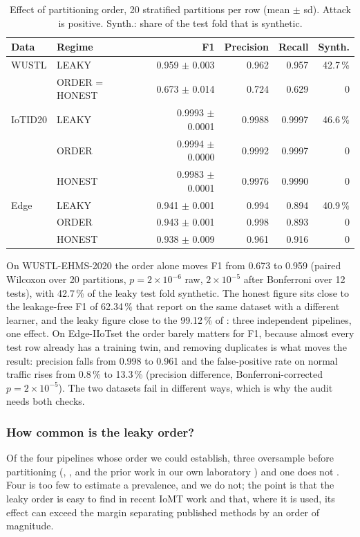 \begin{table}[t]
\caption{Effect of partitioning order, 20 stratified partitions per row (mean $\pm$ sd). Attack is positive. Synth.: share of the test fold that is synthetic.}
\label{tab:order}
\centering\footnotesize
\begin{tabular}{@{}llrrrr@{}}
\toprule
\textbf{Data} & \textbf{Regime} & \textbf{F1} & \textbf{Precision} & \textbf{Recall} & \textbf{Synth.} \\
\midrule
WUSTL & LEAKY & 0.959 $\pm$ 0.003 & 0.962 & 0.957 & 42.7\,\% \\
& ORDER = HONEST & 0.673 $\pm$ 0.014 & 0.724 & 0.629 & 0 \\
\midrule
IoTID20 & LEAKY & 0.9993 $\pm$ 0.0001 & 0.9988 & 0.9997 & 46.6\,\% \\
& ORDER & 0.9994 $\pm$ 0.0000 & 0.9992 & 0.9997 & 0 \\
& HONEST & 0.9983 $\pm$ 0.0001 & 0.9976 & 0.9990 & 0 \\
\midrule
Edge & LEAKY & 0.941 $\pm$ 0.001 & 0.994 & 0.894 & 40.9\,\% \\
& ORDER & 0.943 $\pm$ 0.001 & 0.998 & 0.893 & 0 \\
& HONEST & 0.938 $\pm$ 0.009 & 0.961 & 0.916 & 0 \\
\bottomrule
\end{tabular}
\end{table}

On WUSTL-EHMS-2020 the order alone moves F1 from 0.673 to 0.959 (paired Wilcoxon over 20 partitions, $p = 2\times10^{-6}$ raw, $2\times10^{-5}$ after Bonferroni over 12 tests), with 42.7\,\% of the leaky test fold synthetic. The honest figure sits close to the leakage-free F1 of 62.34\,\% that \cite{tarish2026} report on the same dataset with a different learner, and the leaky figure close to the 99.12\,\% of \cite{hosain2025}: three independent pipelines, one effect. On Edge-IIoTset the order barely matters for F1, because almost every test row already has a training twin, and removing duplicates is what moves the result: precision falls from 0.998 to 0.961 and the false-positive rate on normal traffic rises from 0.8\,\% to 13.3\,\% (precision difference, Bonferroni-corrected $p = 2\times10^{-5}$). The two datasets fail in different ways, which is why the audit needs both checks.

\subsubsection{How common is the leaky order?}
Of the four pipelines whose order we could establish, three oversample before partitioning (\cite{berguiga2025}, \cite{hosain2025}, and the prior work in our own laboratory \cite{badiyani2026}) and one does not \cite{tarish2026}. Four is too few to estimate a prevalence, and we do not; the point is that the leaky order is easy to find in recent IoMT work and that, where it is used, its effect can exceed the margin separating published methods by an order of magnitude.

